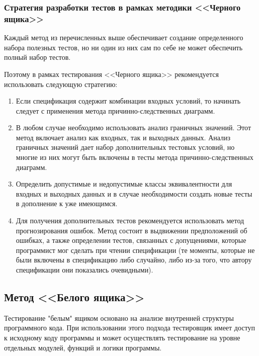 \documentclass[12pt]{article}
\begin{document}
\subsubsection{Стратегия разработки тестов в рамках методики <<Черного ящика>>}

 Каждый метод из перечисленных выше обеспечивает создание определен­ного набора полезных тестов, но ни один из них сам по себе не может обеспечить полный набор тестов. 
 
 Поэтому в рамках тестирования <<Черного ящика>> рекомендуется использовать следующую стратегию:
 
 \begin{enumerate}
 \item Если спецификация содержит комбинации входных условий, то начинать следует с применения метода причинно-следственных диаграмм.
 
 \item В любом случае необходимо использовать анализ граничных значе­ний. Этот метод включает анализ как входных, так и выходных данных. Анализ граничных значений дает набор дополни­тельных тестовых условий, но многие из них могут быть включены в тесты метода причинно-следственных диаграмм.
 
 \item Определить допустимые и недопустимые классы эквивалентности для входных и выходных данных и в случае необходимости создать новые тесты в дополнение к уже имеющимся.
 
 \item Для получения дополнительных тестов рекомендуется использовать метод прогнозирования ошибок. Метод состоит в выдвижении
предположений об ошибках, а также определении тестов, связанных с допущениями, которые программист мог сделать при чтении
спецификации (те моменты, которые не были включены в спецификацию либо случайно, либо из-за того, что автору спецификации
они показались очевидными).
 
     
 \end{enumerate}



\subsection{Метод <<Белого ящика>>}

Тестирование "белым" ящиком основано на анализе внутренней структуры программного кода. При использовании этого подхода тестировщик имеет доступ к исходному коду программы и может осуществлять тестирование на уровне отдельных модулей, функций и логики программы. 
\end{document}
